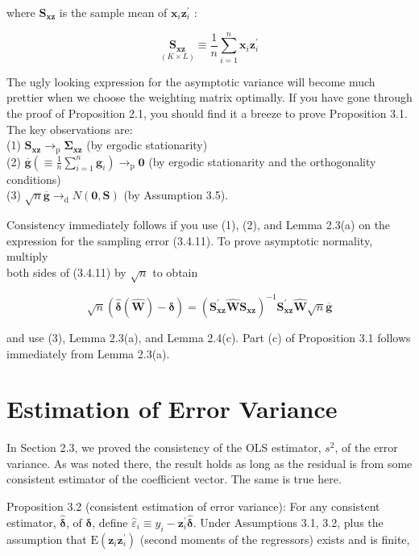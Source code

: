 \documentclass[10pt]{article}
\begin{document}
where $\mathbf{S}_{\mathbf{x z}}$ is the sample mean of $\mathbf{x}_{i} \mathbf{z}_{i}^{\prime}$ :

$$
\underset{(K \times L)}{\mathbf{S}_{\mathbf{x z}}} \equiv \frac{1}{n} \sum_{i=1}^{n} \mathbf{x}_{i} \mathbf{z}_{i}^{\prime}
$$

The ugly looking expression for the asymptotic variance will become much prettier when we choose the weighting matrix optimally. If you have gone through the proof of Proposition 2.1, you should find it a breeze to prove Proposition 3.1. The key observations are:\\
(1) $\mathbf{S}_{\mathbf{x z}} \rightarrow_{\mathrm{p}} \boldsymbol{\Sigma}_{\mathbf{x z}}$ (by ergodic stationarity)\\
(2) $\overline{\mathbf{g}}\left(\equiv \frac{1}{n} \sum_{i=1}^{n} \mathbf{g}_{i}\right) \rightarrow_{\mathrm{p}} \mathbf{0}$ (by ergodic stationarity and the orthogonality conditions)\\
(3) $\sqrt{n} \overline{\mathbf{g}} \rightarrow_{\mathrm{d}} N(\mathbf{0}, \mathbf{S})$ (by Assumption 3.5).

Consistency immediately follows if you use (1), (2), and Lemma 2.3(a) on the expression for the sampling error (3.4.11). To prove asymptotic normality, multiply\\
both sides of (3.4.11) by $\sqrt{n}$ to obtain


\begin{equation*}
\sqrt{n}(\hat{\boldsymbol{\delta}}(\widehat{\mathbf{W}})-\boldsymbol{\delta})=\left(\mathbf{S}_{\mathbf{x z}}^{\prime} \widehat{\mathbf{W}} \mathbf{S}_{\mathbf{x z}}\right)^{-1} \mathbf{S}_{\mathbf{x z}}^{\prime} \widehat{\mathbf{W}} \sqrt{n} \overline{\mathbf{g}} \tag{3.5.3}
\end{equation*}


and use (3), Lemma 2.3(a), and Lemma 2.4(c). Part (c) of Proposition 3.1 follows immediately from Lemma 2.3(a).

\section*{Estimation of Error Variance}
In Section 2.3, we proved the consistency of the OLS estimator, $s^{2}$, of the error variance. As was noted there, the result holds as long as the residual is from some consistent estimator of the coefficient vector. The same is true here.

Proposition 3.2 (consistent estimation of error variance): For any consistent estimator, $\hat{\boldsymbol{\delta}}$, of $\boldsymbol{\delta}$, define $\hat{\varepsilon}_{i} \equiv y_{i}-\mathbf{z}_{i}^{\prime} \hat{\boldsymbol{\delta}}$. Under Assumptions 3.1, 3.2, plus the assumption that $\mathrm{E}\left(\mathbf{z}_{i} \mathbf{z}_{i}^{\prime}\right)$ (second moments of the regressors) exists and is finite,
\end{document}
